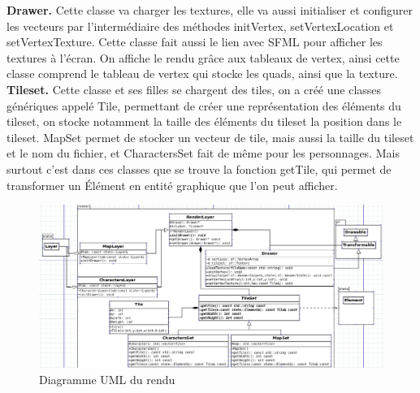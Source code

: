 \documentclass[a4paper,12pt]{article}
\begin{document}
\textbf{Drawer.}
Cette classe va charger les textures, elle va aussi initialiser et configurer les vecteurs par l'intermédiaire des méthodes initVertex, setVertexLocation et setVertexTexture. Cette classe fait aussi le lien avec SFML pour afficher les textures à l'écran. On affiche le rendu grâce aux tableaux de vertex, ainsi cette classe comprend le tableau de vertex qui stocke les quads, ainsi que la texture.
\\

\textbf{Tileset.} 
Cette classe et ses filles se chargent des tiles, on a créé une classes génériques appelé Tile, permettant de créer une représentation des éléments du tileset, on stocke notamment la taille des éléments du tileset la position dans le tileset. MapSet permet de stocker un vecteur de tile, mais aussi la taille du tileset et le nom du fichier, et CharactersSet fait de même pour les personnages. Mais surtout c'est dans ces classes que se trouve la fonction getTile, qui permet de transformer un Élément en entité graphique que l'on peut afficher. 



\begin{figure}[H]
\begin{center}
  \includegraphics[width=1\textwidth]{images/UML_Render.png}
  \caption{Diagramme UML du rendu}
 \end{center}
 \end{figure}
 
\end{document}
